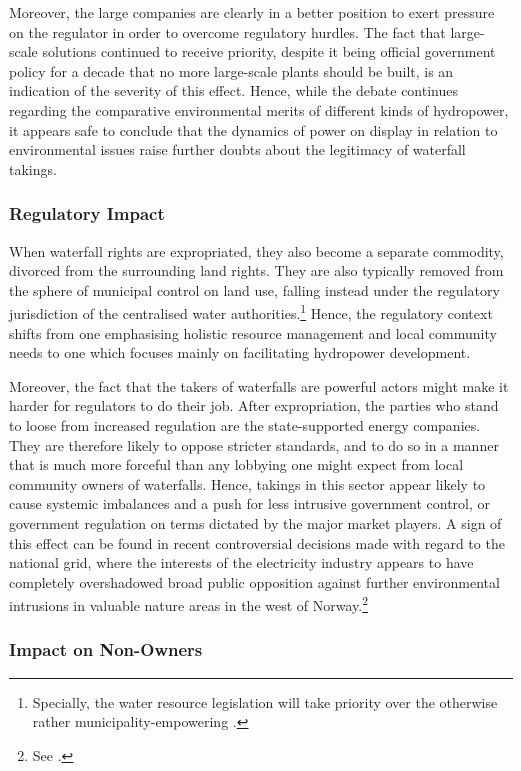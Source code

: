 Moreover, the large companies are clearly in a better position to exert pressure on the regulator in order to overcome regulatory hurdles. The fact that large-scale solutions continued to receive priority, despite it being official government policy for a decade that no more large-scale plants should be built, is an indication of the severity of this effect. Hence, while the debate continues regarding the comparative environmental merits of different kinds of hydropower, it appears safe to conclude that the dynamics of power on display in relation to environmental issues raise further doubts about the legitimacy of waterfall takings.

\subsubsection{Regulatory Impact}\label{sec:5:7:7}

When waterfall rights are expropriated, they also become a separate commodity, divorced from the surrounding land rights. They are also typically removed from the sphere of municipal control on land use, falling instead under the regulatory jurisdiction of the centralised water authorities.\footnote{Specially, the water resource legislation will take priority over the otherwise rather municipality-empowering \cite{pb08}.} Hence, the regulatory context shifts from one emphasising holistic resource management and local community needs to one which focuses mainly on facilitating hydropower development.

Moreover, the fact that the takers of waterfalls are powerful actors might make it harder for regulators to do their job. After expropriation, the parties who stand to loose from increased regulation are the state-supported energy companies. They are therefore likely to oppose stricter standards, and to do so in a manner that is much more forceful than any lobbying one might expect from local community owners of waterfalls. Hence, takings in this sector appear likely to cause systemic imbalances and a push for less intrusive government control, or government regulation on terms dictated by the major market players. A sign of this effect can be found in recent controversial decisions made with regard to the national grid, where the interests of the electricity industry appears to have completely overshadowed broad public opposition against further environmental intrusions in valuable nature areas in the west of Norway.\footnote{See \cite{brekke12}.}

\subsubsection{Impact on Non-Owners}\label{sec:5:7:8}

